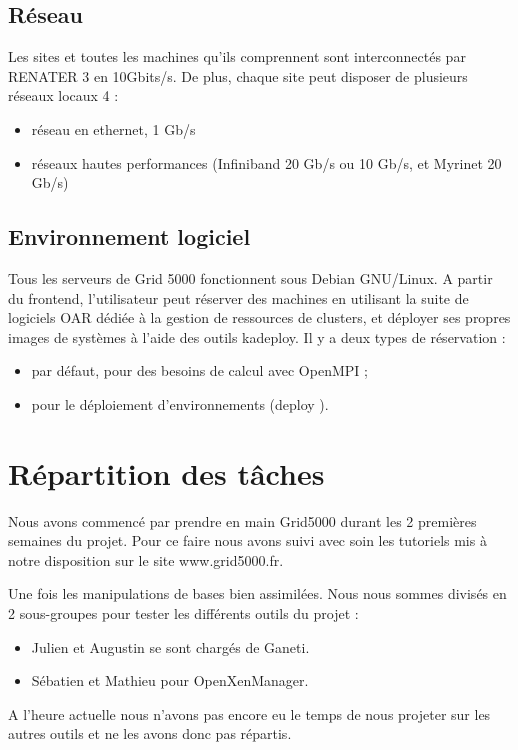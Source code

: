   \subsection{Réseau}
Les sites et toutes les machines qu'ils comprennent sont interconnectés par RENATER 3 en 10Gbits/s. De
plus, chaque site peut disposer de plusieurs réseaux locaux 4 :
\begin{itemize}
\item réseau en ethernet, 1 Gb/s
\item réseaux hautes performances (Infiniband 20 Gb/s ou 10 Gb/s, et Myrinet 20 Gb/s)
\end{itemize}

  \subsection{Environnement logiciel}
Tous les serveurs de Grid 5000 fonctionnent sous Debian GNU/Linux.
A partir du frontend, l'utilisateur peut réserver des machines en utilisant la suite de logiciels OAR dédiée à
la gestion de ressources de clusters, et déployer ses propres images de systèmes à l'aide des outils kadeploy.
Il y a deux types de réservation :
\begin{itemize}
\item par défaut, pour des besoins de calcul avec OpenMPI ;
\item pour le déploiement d'environnements (deploy ).
\end{itemize}


\section{Répartition des tâches}
Nous avons commencé par prendre en main Grid5000 durant les 2 premières semaines du projet. Pour ce faire nous avons suivi avec soin les tutoriels mis à notre disposition sur le site www.grid5000.fr.

Une fois les manipulations de bases bien assimilées. Nous nous sommes divisés en 2 sous-groupes pour tester les différents outils du projet :
\begin{itemize}
  \item Julien et Augustin se sont chargés de Ganeti.
  \item Sébatien et Mathieu pour OpenXenManager.
\end{itemize}
A l'heure actuelle nous n'avons pas encore eu le temps de nous projeter sur les autres outils et ne les avons donc pas répartis.

